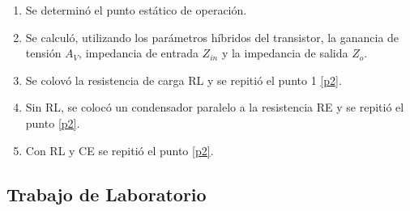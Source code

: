 \documentclass[12pt, a4paper]{article}
\begin{document}
    \begin{enumerate}
        \item Se determinó el punto estático de operación. \label{p1}
        \item Se calculó, utilizando los parámetros híbridos del transistor, la ganancia de tensión $A_V$, impedancia de entrada $Z_{in}$ y la impedancia de salida $Z_o$. \label{p2} %
        \item Se colovó la resistencia de carga RL y se repitió el punto 1 \ref{p2}.
        \item Sin RL, se colocó un condensador paralelo a la resistencia RE y se repitió el punto \ref{p2}.
        \item Con RL y CE se repitió el punto \ref{p2}.
    \end{enumerate}

    \subsection{Trabajo de Laboratorio}
\end{document}
